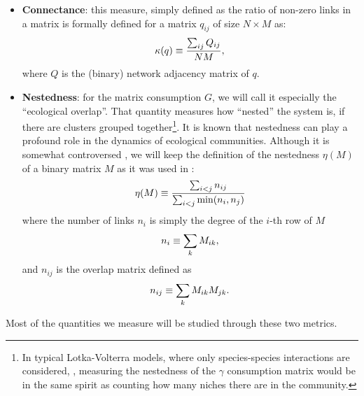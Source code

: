 \documentclass[12pt, titlepage]{report}
\begin{document}
\begin{itemize}
\item \textbf{Connectance}: this measure, simply defined as the ratio of non-zero links in a matrix %
is formally defined for a matrix $q_{ij}$  of size $N\times M$ as:
\begin{equation}
\kappa(q)\equiv \frac{\sum_{ij} Q_{ij}}{NM},
\end{equation}
where $Q$ is the (binary) network adjacency matrix of $q$.


\item \textbf{Nestedness}: for the matrix consumption $G$, we will call it especially the ``ecological overlap''. That quantity measures how ``nested'' the system is, \ie if there are clusters grouped together\footnote{In typical Lotka-Volterra models, where only species-species interactions are considered, \eg \cite{iannelli_introduction_2014}, measuring the nestedness of the $\gamma$ consumption matrix would be in the same spirit as counting how many niches there are in the community.}. It is known \cite{bastolla_architecture_2009, pascual-garcia_mutualism_2017} that nestedness can play a profound role in the dynamics of ecological communities. Although it is somewhat controversed \cite{jonhson_factors_2013}, we will keep the definition of the nestedness $\eta(M)$ of a binary matrix $M$ as it was used in \cite{bastolla_architecture_2009}:
\begin{equation}
\eta(M)\equiv \frac{\sum_{i<j} n_{ij}}{\sum_{i < j} \min(n_i, n_j)}
\end{equation}
where the number of links $n_i$ is simply the degree of the $i$-th row of $M$
\begin{equation}
n_i \equiv \sum_k M_{ik},
\end{equation}
and $n_{ij}$ is the overlap matrix defined as
\begin{equation}
n_{ij}\equiv \sum_k M_{ik}M_{jk}.
\end{equation}
\end{itemize}
Most of the quantities we measure will be studied through these two metrics.
\end{document}

